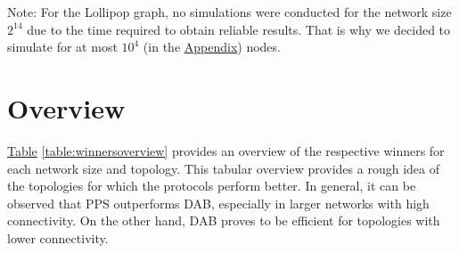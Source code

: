 Note: For the Lollipop graph, no simulations were conducted for the network size $2^{14}$ due to the time required to obtain reliable results. That is why we decided to simulate for at most $10^{4}$ (in the \hyperref[chap:appendix]{Appendix}) nodes.

\section{Overview}
\hyperref[table:winnersoverview]{Table} \ref{table:winnersoverview} provides an overview of the respective winners for each network size and topology. This tabular overview provides a rough idea of the topologies for which the protocols perform better. In general, it can be observed that PPS outperforms DAB, especially in larger networks with high connectivity. On the other hand, DAB proves to be efficient for topologies with lower connectivity.


